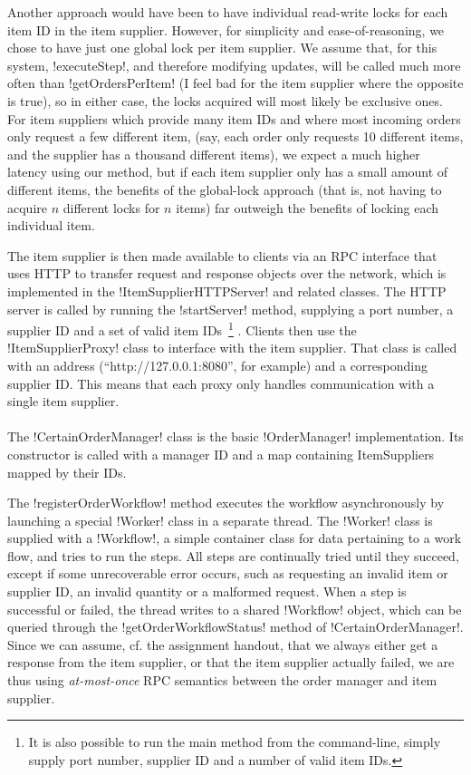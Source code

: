 \documentclass[a4paper, 12pt]{article}
\begin{document}
Another approach would have been to have individual read-write locks
for each item ID in the item supplier. However, for simplicity and
ease-of-reasoning, we chose to have just one global lock per item
supplier. We assume that, for this system, !executeStep!, and
therefore modifying updates, will be called much more often than
!getOrdersPerItem! (I feel bad for the item supplier where the
opposite is true), so in either case, the locks acquired will most
likely be exclusive ones. For item suppliers which provide many item
IDs and where most incoming orders only request a few different item,
(say, each order only requests 10 different items, and the supplier
has a thousand different items), we expect a much higher latency using
our method, but if each item supplier only has a small amount of
different items, the benefits of the global-lock approach (that is,
not having to acquire $n$ different locks for $n$ items) far outweigh
the benefits of locking each individual item.

The item supplier is then made available to clients via an RPC
interface that uses HTTP to transfer request and response objects over
the network, which is implemented in the !ItemSupplierHTTPServer! and
related classes. The HTTP server is called by running the
!startServer! method, supplying a port number, a supplier ID and a set
of valid item IDs~\footnote{It is also possible to run the main method
  from the command-line, simply supply port number, supplier ID and a
  number of valid item IDs. } . Clients then use the
!ItemSupplierProxy! class to interface with the item supplier. That
class is called with an address (``http://127.0.0.1:8080'', for
example) and a corresponding supplier ID. This means that each proxy
only handles communication with a single item supplier.

\paragraph{}

The !CertainOrderManager! class is the basic !OrderManager!
implementation. Its constructor is called with a manager ID and a map
containing ItemSuppliers mapped by their IDs.

The !registerOrderWorkflow! method executes the workflow
asynchronously by launching a special !Worker! class in a separate
thread. The !Worker! class is supplied with a !Workflow!, a simple
container class for data pertaining to a work flow, and tries to run
the steps. All steps are continually tried until they succeed, except
if some unrecoverable error occurs, such as requesting an invalid item
or supplier ID, an invalid quantity or a malformed request. When a
step is successful or failed, the thread writes to a shared !Workflow!
object, which can be queried through the !getOrderWorkflowStatus!
method of !CertainOrderManager!. Since we can assume, cf. the
assignment handout, that we always either get a response from the item
supplier, or that the item supplier actually failed, we are thus using
\emph{at-most-once} RPC semantics between the order manager and item
supplier.
\end{document}
